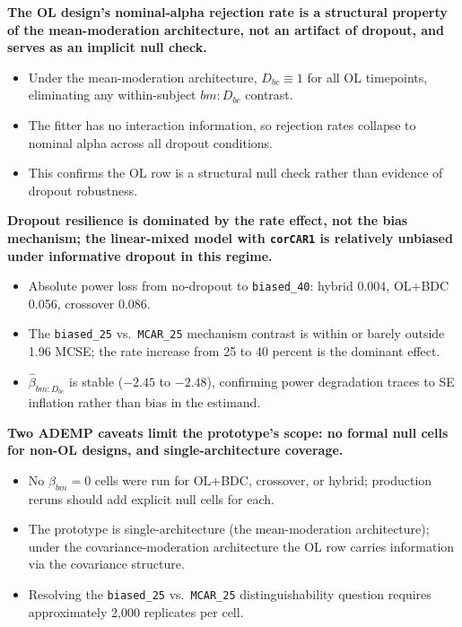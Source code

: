 \documentclass[
  11pt,
]{article}
\begin{document}
\textbf{The OL design's nominal-alpha rejection rate is a structural property of the mean-moderation architecture, not an artifact of dropout, and serves as an implicit null check.}

\begin{itemize}\setlength{\itemsep}{2pt}\setlength{\parskip}{0pt}
\item Under the mean-moderation architecture, $D_{bc} \equiv 1$ for all OL timepoints, eliminating any within-subject $bm{:}D_{bc}$ contrast.
\item The fitter has no interaction information, so rejection rates collapse to nominal alpha across all dropout conditions.
\item This confirms the OL row is a structural null check rather than evidence of dropout robustness.
\end{itemize}

\textbf{Dropout resilience is dominated by the rate effect, not the bias mechanism; the linear-mixed model with \texttt{corCAR1} is relatively unbiased under informative dropout in this regime.}

\begin{itemize}\setlength{\itemsep}{2pt}\setlength{\parskip}{0pt}
\item Absolute power loss from no-dropout to \texttt{biased\_40}: hybrid 0.004, OL+BDC 0.056, crossover 0.086.
\item The \texttt{biased\_25} vs.\ \texttt{MCAR\_25} mechanism contrast is within or barely outside 1.96 MCSE; the rate increase from 25 to 40 percent is the dominant effect.
\item $\hat\beta_{bm:D_{bc}}$ is stable ($-2.45$ to $-2.48$), confirming power degradation traces to SE inflation rather than bias in the estimand.
\end{itemize}

\textbf{Two ADEMP caveats limit the prototype's scope: no formal null cells for non-OL designs, and single-architecture coverage.}

\begin{itemize}\setlength{\itemsep}{2pt}\setlength{\parskip}{0pt}
\item No $\beta_{bm}=0$ cells were run for OL+BDC, crossover, or hybrid; production reruns should add explicit null cells for each.
\item The prototype is single-architecture (the mean-moderation architecture); under the covariance-moderation architecture the OL row carries information via the covariance structure.
\item Resolving the \texttt{biased\_25} vs.\ \texttt{MCAR\_25} distinguishability question requires approximately 2,000 replicates per cell.
\end{itemize}
\end{document}
